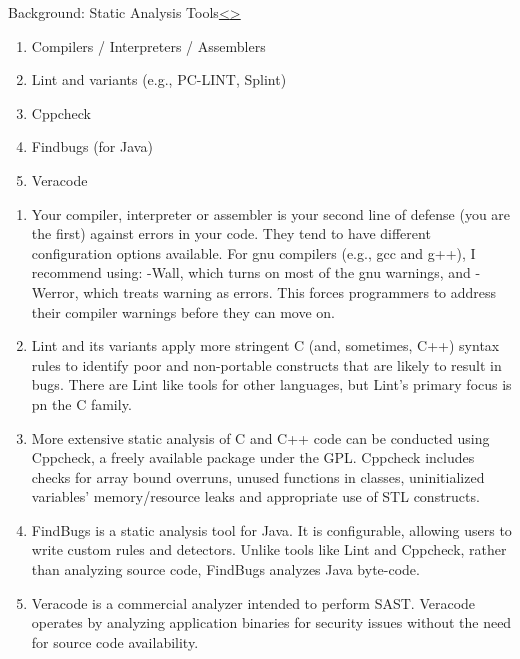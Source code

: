 \documentclass[12pt]{extarticle}
\newenvironment{instructionblock}{\Large\bgroup}{\egroup}
\begin{document}
\pagebreak
\begin{slide}{Background: Static Analysis Tools}{\hyperref[slide 9]{\textless}\hyperref[slide 11]{\textgreater}}
	\vskip 10pt
	\begin{instructionblock}
	\begin{enumerate}
	\item Compilers / Interpreters / Assemblers\cite{WikipediaStaticAnalysisTools}
	\item Lint and variants (e.g., PC-LINT, Splint)\cite{WikipediaStaticAnalysisTools}
	\item Cppcheck\cite{WikipediaStaticAnalysisTools}
	\item Findbugs (for Java)\cite{WikipediaStaticAnalysisTools}
	\item Veracode\cite{WikipediaStaticAnalysisTools}
	\end{enumerate}

	\end{instructionblock}
\end{slide}
\begin{enumerate}
\item Your compiler, interpreter or assembler is your second line of defense (you are the first) against errors in your code.  They tend to have different configuration options available.  For gnu compilers (e.g., gcc and g++), I recommend using: -Wall, which turns on most of the gnu warnings, and -Werror, which treats warning as errors.  This forces programmers to address their compiler warnings before they can move on.
\item Lint and its variants apply more stringent C (and, sometimes, C++) syntax rules to identify poor and non-portable constructs that are likely to result in bugs.  There are Lint like tools for other languages, but Lint's primary focus is pn the C family\cite{WikipediaLint}.
\item More extensive static analysis of C and C++ code can be conducted using Cppcheck, a freely available package under the GPL.  Cppcheck includes checks for array bound overruns, unused functions in classes, uninitialized variables' memory/resource leaks and appropriate use of STL constructs\cite{WikipediaCppcheck}.  
\item FindBugs is a static analysis tool for Java.  It is configurable, allowing users to write custom rules and detectors.  Unlike tools like Lint and Cppcheck, rather than analyzing source code, FindBugs analyzes Java byte-code\cite{WikipediaFindBugs}.
\item Veracode is a commercial analyzer intended to perform SAST.  Veracode operates by analyzing application binaries for security issues without the need for source code availability\cite{WikipediaStaticAnalysisTools}.
\end{enumerate}
\end{document}
